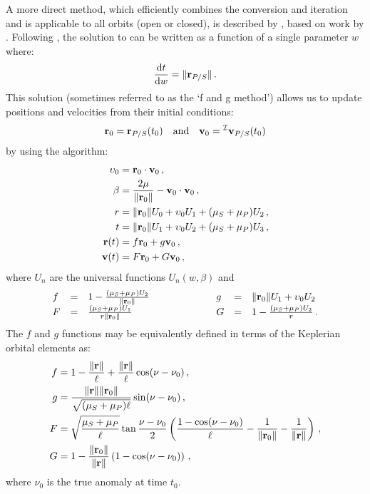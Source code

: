 A more direct method, which efficiently combines the conversion and iteration and is applicable to all orbits (open or closed), is described by \citet{shepperd1985universal}, based on work by  \citet{goodyear1965completely,goodyear1966general}.  Following \citet{sundman1913memoire}, the solution to  can be written as a function of a single parameter $w$ where:
\begin{equation}
\frac{\mathrm{d} t}{\mathrm{d} w} = \Vert \mathbf r_{P/S} \Vert \,.
\end{equation}
This solution (sometimes referred to as the `f and g method') allows us to update positions and velocities from their initial conditions:
\begin{equation}
\mathbf r_0 = \mathbf r_{P/S}(t_0) \quad \textrm{and} \quad \mathbf v_0 =  {}^\mathcal I \mathbf v_{P/S} (t_0)
\end{equation}
by using the algorithm:
\begin{align}
\upsilon_0 &= \mathbf r_0 \cdot \mathbf v_0  \,,\\
\beta &= \frac{2\mu}{\Vert \mathbf r_0\Vert} - \mathbf v_0 \cdot \mathbf v_0  \,,\\
r &= \Vert \mathbf r_0 \Vert U_0 + \upsilon_0 U_1 + (\mu_S + \mu_P) U_2  \,,\\
t &= \Vert \mathbf r_0 \Vert U_1 + \upsilon_0 U_2 + (\mu_S + \mu_P) U_3 \label{eq:altKeplerEq}  \,, \\
\mathbf r(t) &= f \mathbf r_0 + g \mathbf v_0 \label{eq:fandg}  \,,\\
\mathbf v(t) &= F \mathbf  r_0 + G \mathbf v_0 \label{eq:FandG}  \,,
\end{align}
where $U_n$ are the universal functions $U_n(w,\beta)$ \citep{battin1987introduction} and
\begin{equation}
\begin{array}{l c l >{\hspace{2cm}} l c l}
f &=& 1 - \frac{(\mu_S + \mu_P) U_2}{\Vert \mf r_0 \Vert} & g &=& \Vert \mf r_0 \Vert U_1 + \upsilon_0 U_2 \\
F &=& \frac{(\mu_S + \mu_P) U_1}{r \Vert \mf r_0 \Vert} & G &=& 1 - \frac{(\mu_S + \mu_P) U_2}{r} \,.
\end{array}
\end{equation}
The $f$ and $g$ functions may be equivalently defined in terms of the Keplerian orbital elements as:
\begin{equation}
\begin{split}
f &= 1 - \frac{\Vert \mathbf r \Vert}{\ell} + \frac{\Vert \mathbf r \Vert}{\ell}\cos(\nu - \nu_0) \,, \\
g &= \frac{\Vert \mathbf r \Vert \Vert \mathbf r_0 \Vert}{\sqrt{(\mu_S + \mu_P) \ell}}\sin(\nu - \nu_0)  \,,\\
F &= \sqrt{\frac{\mu_S + \mu_P}{\ell}}\tan\frac{\nu - \nu_0}{2}\left(\frac{1 - \cos(\nu - \nu_0)}{\ell} - \frac{1}{\Vert \mathbf r_0\Vert} - \frac{1}{\Vert \mathbf r \Vert} \right) \,, \\
G &= 1 - \frac{\Vert \mathbf r_0\Vert}{\Vert \mathbf r\Vert}\left(1 - \cos(\nu - \nu_0)\right) \,,
\end{split}
\end{equation}
where $\nu_0$ is the true anomaly at time $t_0$.

